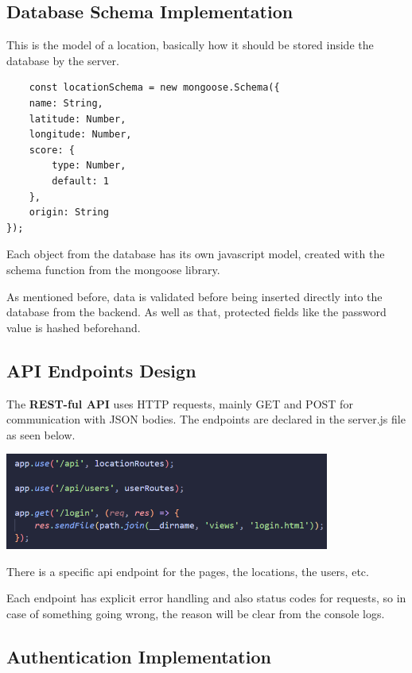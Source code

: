 \documentclass[12pt,a4paper]{report}
\begin{document}
\subsection{Database Schema Implementation}

This is the model of a location, basically how it should be stored inside the database by the server.

\begin{lstlisting}
    const locationSchema = new mongoose.Schema({
    name: String,
    latitude: Number,
    longitude: Number,
    score: {
        type: Number,
        default: 1
    },
    origin: String
});
\end{lstlisting}

Each object from the database has its own javascript model, created with the schema function from the mongoose library.

As mentioned before, data is validated before being inserted directly into the database from the backend. As well as that, protected fields like the password value is hashed beforehand.

\subsection{API Endpoints Design}

The \textbf{REST-ful API} uses HTTP requests, mainly GET and POST for communication with JSON bodies. The endpoints are declared in the server.js file as seen below.

\begin{center}
\includegraphics[width=0.8\textwidth]{images/api.png}
\end{center}

There is a specific api endpoint for the pages, the locations, the users, etc.

Each endpoint has explicit error handling and also status codes for requests, so in case of something going wrong, the reason will be clear from the console logs.

\subsection{Authentication Implementation}
\end{document}
